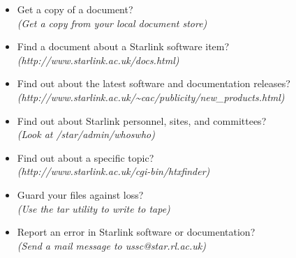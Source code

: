 \documentclass[twoside]{article}
\newcommand{\htmladdnormallink}[2]{#1}
\begin{document}
\begin{itemize}
\hspace*{10mm} {\em (Ask your Site Manager, or look in your Local Guide)}
\item Get a copy of a document?\\
\hspace*{10mm} {\em (Get a copy from your local document store)}
\item Find a document about a Starlink software item?\\
\hspace*{10mm} {\em (\htmladdnormallink{http://www.starlink.ac.uk/docs.html}
{http://www.starlink.ac.uk/docs.html})}
\item Find out about the latest software and documentation releases?\\
\hspace*{10mm}
{\em (http://www.starlink.ac.uk/\~{}cac/publicity/new\_products.html)}
\item Find out about Starlink personnel, sites, and committees?\\
\hspace*{10mm} {\em (Look at /star/\-admin/\-whoswho)}
\item Find out about a specific topic?\\
\hspace*{10mm} {\em (\htmladdnormallink{http://www.starlink.ac.uk/cgi-bin/htxfinder}
{http://www.starlink.ac.uk/cgi-bin/htxfinder})}
\item Guard your files against loss?\\
\hspace*{10mm} {\em (Use the tar utility to write to tape)}
\item Report an error in Starlink software or documentation?\\
\hspace*{10mm} {\em (Send a mail message to ussc@star.rl.ac.uk)}
\end{itemize}
\end{document}
